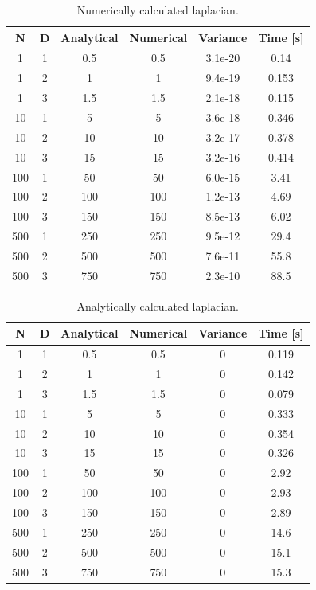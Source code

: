 \documentclass[english, a4paper]{article}
\begin{document}
\begin{table}[H]
  \centering
  \caption{Numerically calculated laplacian.}
  \begin{tabular}{ | c | c | c | c | c | c |}
    \hline
    N &D &Analytical &Numerical &Variance &Time [s] \\*
    \hline
    1& 1& 0.5& 0.5& 3.1e-20& 0.14\\*
    \hline
    1& 2& 1& 1& 9.4e-19& 0.153\\*
    \hline
    1& 3& 1.5& 1.5& 2.1e-18& 0.115\\*
    \hline
    10& 1& 5& 5& 3.6e-18& 0.346\\*
    \hline
    10& 2& 10& 10& 3.2e-17& 0.378\\*
    \hline
    10& 3& 15& 15& 3.2e-16& 0.414\\*
    \hline
    100& 1& 50& 50& 6.0e-15& 3.41\\*
    \hline
    100& 2& 100& 100& 1.2e-13& 4.69\\*
    \hline
    100& 3& 150& 150& 8.5e-13& 6.02\\*
    \hline
    500& 1& 250& 250& 9.5e-12& 29.4\\*
    \hline
    500& 2& 500& 500& 7.6e-11& 55.8\\*
    \hline
    500& 3& 750& 750& 2.3e-10& 88.5 \\*
    \hline
  \end{tabular}
  \label{tab:Tabell1}
\end{table}


\begin{table}[H]
  
  \centering
  \caption{Analytically calculated laplacian.}
  \begin{tabular}{ | c | c | c | c | c | c |}
    \hline
    N &D &Analytical &Numerical &Variance &Time [s] \\*
    \hline
    1& 1& 0.5& 0.5& 0& 0.119\\*
    \hline
    1& 2& 1& 1& 0& 0.142\\*
    \hline
    1& 3& 1.5& 1.5& 0& 0.079\\*
    \hline
    10& 1& 5& 5& 0& 0.333\\*
    \hline
    10& 2& 10& 10& 0& 0.354\\*
    \hline
    10& 3& 15& 15& 0& 0.326\\*
    \hline
    100& 1& 50& 50& 0& 2.92\\*
    \hline
    100& 2& 100& 100& 0& 2.93\\*
    \hline
    100& 3& 150& 150& 0& 2.89\\*
    \hline
    500& 1& 250& 250& 0& 14.6\\*
    \hline
    500& 2& 500& 500& 0& 15.1\\*
    \hline
    500& 3& 750& 750& 0& 15.3\\*
    \hline
  \end{tabular}
  \label{tab:Tabell2}
\end{table}
\end{document}
